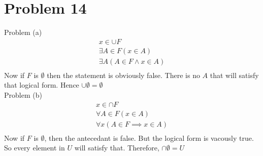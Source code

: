 \documentclass{article}
\begin{document}
\section{Problem 14}
Problem (a)
\begin{align*}
  x \in \cup F \\
  \exists A \in F(x \in A)  \\
  \exists A (A \in F \land x \in A) \\
\end{align*}
Now if $F$ is $\emptyset$ then the statement is obviously false. There
is no $A$ that will satisfy that logical form. Hence $\cup \emptyset =
\emptyset$ \\

Problem (b)
\begin{align*}
  x \in \cap F \\
  \forall A \in F(x \in A) \\
  \forall x (A \in F \implies x \in A) \\
\end{align*}
Now if $F$ is $\emptyset$, then the antecedant is false. But the
logical form is vacously true. So every element in $U$ will satisfy
that. Therefore, $\cap \emptyset = U$
\end{document}
